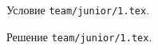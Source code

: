 \problem{}
Условие \texttt{team/junior/1.tex}.

\solution Решение \texttt{team/junior/1.tex}.
\endproblem

